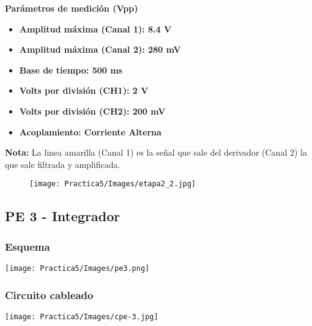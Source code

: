 \documentclass[12pt]{article}
\begin{document}
        \textbf{Parámetros de medición (Vpp)}
            \begin{multicols}{2}
                \begin{itemize}
                    \item[\checkmark] \textbf{Amplitud máxima (Canal 1): 8.4 V}
                
                    \item[\checkmark] \textbf{Amplitud máxima (Canal 2): 280 mV}
                    \item[\checkmark] \textbf{Base de tiempo: 500 ms}
            \columnbreak
                    \item[\checkmark] \textbf{Volts por división (CH1): 2 V}
                    \item[\checkmark] \textbf{Volts por división (CH2): 200 mV}
                    \item[\checkmark] \textbf{Acoplamiento: Corriente Alterna}
                \end{itemize}
            \end{multicols}
            
            \textbf{Nota:} La linea amarilla (Canal 1) es la señal que sale del derivador (Canal 2) la que sale filtrada y amplificada. 
         
            \begin{figure}[h!]
                \centering
                \texttt{[image: Practica5/Images/etapa2\_2.jpg]}
            \end{figure}
        \newpage
        \subsection{PE 3 - Integrador}
        \begin{multicols}{2}
            \subsubsection{Esquema}

                \texttt{[image: Practica5/Images/pe3.png]}

        \columnbreak
            \subsubsection{Circuito cableado}

                \texttt{[image: Practica5/Images/cpe-3.jpg]}

            \end{multicols}
            
\end{document}
